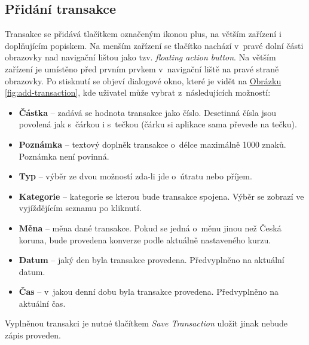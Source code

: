 \documentclass[
  biblatex,
  figures=true,
  tables=false,
  glossaries,
  index
]{kidiplom}
\begin{document}
\subsection{Přidání transakce}
Transakce se přidává tlačítkem označeným ikonou plus, na větším zařízení i doplňujícím popiskem. Na menším zařízení se tlačítko nachází v~pravé dolní části obrazovky nad navigační lištou jako tzv. \textit{floating action button}. Na větším zařízení je umístěno před prvním prvkem v~navigační liště na pravé straně obrazovky. Po stisknutí se objeví dialogové okno, které je vidět na \hyperref[fig:add-transaction]{Obrázku \ref{fig:add-transaction}}, kde uživatel může vybrat z~následujících možností:
\begin{itemize}
  \item \textbf{Částka} -- zadává se hodnota transakce jako číslo. Desetinná čísla jsou povolená jak s~čárkou i s~tečkou (čárku si aplikace sama převede na tečku).
  \item \textbf{Poznámka} -- textový doplněk transakce o~délce maximálně 1000 znaků.  Poznámka není povinná.
  \item \textbf{Typ} -- výběr ze dvou možností zda-li jde o~útratu nebo příjem.
  \item \textbf{Kategorie} -- kategorie se kterou bude transakce spojena. Výběr se zobrazí ve vyjíždějícím seznamu po kliknutí.
  \item \textbf{Měna} -- měna dané transakce. Pokud se jedná o~měnu jinou než Česká koruna, bude provedena konverze podle aktuálně nastaveného kurzu.
  \item \textbf{Datum} -- jaký den byla transakce provedena. Předvyplněno na aktuální datum.
  \item \textbf{Čas} -- v~jakou denní dobu byla transakce provedena. Předvyplněno na aktuální čas.
\end{itemize}
Vyplněnou transakci je nutné tlačítkem \textit{Save Transaction} uložit jinak nebude zápis proveden.
\end{document}
